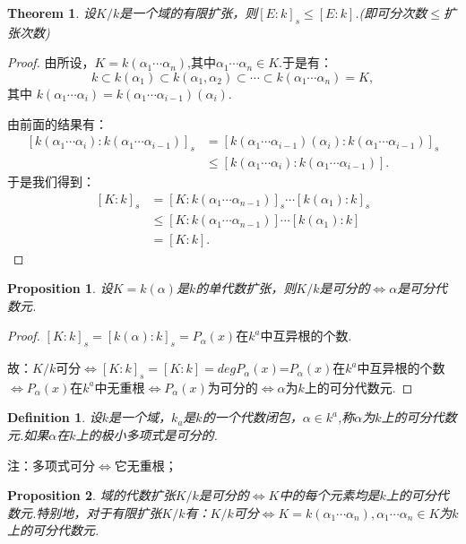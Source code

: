 \documentclass[UTF8]{article}
\newtheorem{thm}{Theorem}[section]
\newtheorem{defn}{Definition}[section]
\newtheorem{prop}{Proposition}[section]
\begin{document}
\begin{thm}
设$K/k$是一个域的有限扩张，则$[E:k]_s\le [E:k]$.(即可分次数$\le$扩张次数)
\end{thm}
\begin{proof}
由所设，$K=k(\alpha_1\cdots\alpha_n)$,其中$\alpha_1\cdots\alpha_n\in K$.于是有：
$$k\subset k(\alpha_1)\subset k(\alpha_1,\alpha_2)\subset\cdots\subset k(\alpha_1\cdots\alpha_n)=K,$$其中 $k(\alpha_1\cdots\alpha_i)= k(\alpha_1\cdots\alpha_{i-1})(\alpha_i).$

由前面的结果有：
\[
\begin{split}
[k(\alpha_1\cdots\alpha_i):k(\alpha_1\cdots\alpha_{i-1})]_s&=[k(\alpha_1\cdots\alpha_{i-1})(\alpha_i):k(\alpha_1\cdots\alpha_{i-1})]_s\\
&\le[k(\alpha_1\cdots\alpha_i):k(\alpha_1\cdots\alpha_{i-1})].
\end{split}
\]
于是我们得到：
\[
\begin{split}
[K:k]_s&=[K: k(\alpha_1\cdots\alpha_{n-1})]_s\cdots[k(\alpha_1):k]_s\\
&\le[K: k(\alpha_1\cdots\alpha_{n-1})]\cdots[k(\alpha_1):k]\\
&=[K:k].
\end{split}
\]
\end{proof}
\begin{prop}

 设$K=k(\alpha)$是$k$的单代数扩张，则$K/k$是可分的$\Longleftrightarrow \alpha$是可分代数元.
\end{prop}
\begin{proof}
$[K:k]_s=[k(\alpha):k]_s=P_{\alpha}(x)$在$k^a$中互异根的个数.

故：$K/k$可分$\Longleftrightarrow[K:k]_s=[K:k]=degP_{\alpha}(x)$=$P_{\alpha}(x)$在$k^a$中互异根的个数$\Longleftrightarrow P_{\alpha}(x)$在$k^a$中无重根$\Longleftrightarrow P_{\alpha}(x)$为可分的$\Longleftrightarrow \alpha$为$k$上的可分代数元.
\end{proof}
\begin{defn}
 设$k$是一个域，$k_a$是$k$的一个代数闭包，$\alpha\in k^a$,称$\alpha$为$k$上的可分代数元.如果$\alpha$在$k$上的极小多项式是可分的.
\end{defn}
注：多项式可分$\Longleftrightarrow$它无重根；

\begin{prop}
域的代数扩张$K/k$是可分的$\Longleftrightarrow K$中的每个元素均是$k$上的可分代数元.特别地，对于有限扩张$K/k$有：$K/k$可分$\Longleftrightarrow K=k(\alpha_1\cdots\alpha_n),\alpha_1\cdots\alpha_n\in K$为$k$上的可分代数元.
\end{prop} 
\end{document}

